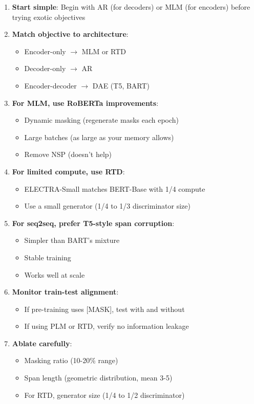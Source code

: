 \documentclass{article}
\begin{document}
\begin{enumerate}
\item \textbf{Start simple}: Begin with AR (for decoders) or MLM (for encoders) before trying exotic objectives

\item \textbf{Match objective to architecture}:
\begin{itemize}
\item Encoder-only $\rightarrow$ MLM or RTD
\item Decoder-only $\rightarrow$ AR
\item Encoder-decoder $\rightarrow$ DAE (T5, BART)
\end{itemize}

\item \textbf{For MLM, use RoBERTa improvements}:
\begin{itemize}
\item Dynamic masking (regenerate masks each epoch)
\item Large batches (as large as your memory allows)
\item Remove NSP (doesn't help)
\end{itemize}

\item \textbf{For limited compute, use RTD}:
\begin{itemize}
\item ELECTRA-Small matches BERT-Base with 1/4 compute
\item Use a small generator (1/4 to 1/3 discriminator size)
\end{itemize}

\item \textbf{For seq2seq, prefer T5-style span corruption}:
\begin{itemize}
\item Simpler than BART's mixture
\item Stable training
\item Works well at scale
\end{itemize}

\item \textbf{Monitor train-test alignment}:
\begin{itemize}
\item If pre-training uses [MASK], test with and without
\item If using PLM or RTD, verify no information leakage
\end{itemize}

\item \textbf{Ablate carefully}:
\begin{itemize}
\item Masking ratio (10-20\% range)
\item Span length (geometric distribution, mean 3-5)
\item For RTD, generator size (1/4 to 1/2 discriminator)
\end{itemize}
\end{enumerate}
\end{document}
